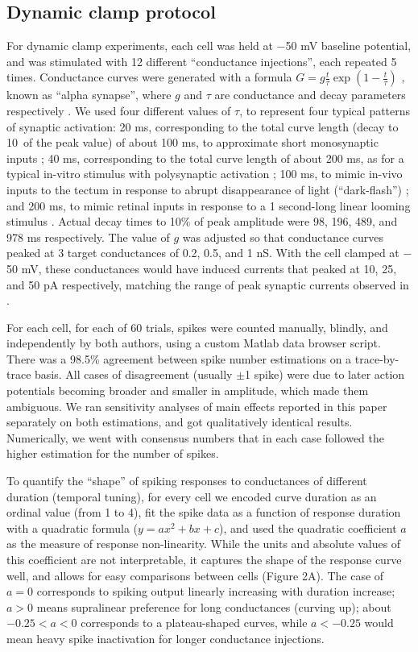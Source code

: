 \documentclass{article}
\begin{document}
\subsection*{Dynamic clamp protocol}

For dynamic clamp experiments, each cell was held at $-$50 mV baseline potential, and was stimulated with 12 different “conductance injections”, each repeated 5 times. Conductance curves were generated with a formula $G=g\frac{t}{\tau}\exp(1-\frac{t}{\tau})$ , known as “alpha synapse”, where $g$ and $\tau$ are conductance and decay parameters respectively \citep{destexhe1994}. We used four different values of $\tau$, to represent four typical patterns of synaptic activation: 20 ms, corresponding to the total curve length (decay to 10\ of the peak value) of about 100 ms, to approximate short monosynaptic inputs \citep{ciarleglio2015}; 40 ms, corresponding to the total curve length of about 200 ms, as for a typical in-vitro stimulus with polysynaptic activation \citep{xu2011}; 100 ms, to mimic in-vivo inputs to the tectum in response to abrupt disappearance of light (“dark-flash”) \citep{khakhalin2014}; and 200 ms, to mimic retinal inputs in response to a 1 second-long linear looming stimulus \citep{khakhalin2014}. Actual decay times to 10\% of peak amplitude were 98, 196, 489, and 978 ms respectively. The value of $g$ was adjusted so that conductance curves peaked at 3 target conductances of 0.2, 0.5, and 1 nS. With the cell clamped at $-$50 mV, these conductances would have induced currents that peaked at 10, 25, and 50 pA respectively, matching the range of peak synaptic currents observed in \citep{xu2011,khakhalin2014,ciarleglio2015}. 

For each cell, for each of 60 trials, spikes were counted manually, blindly, and independently by both authors, using a custom Matlab data browser script. There was a 98.5\% agreement between spike number estimations on a trace-by-trace basis. All cases of disagreement (usually $\pm$1 spike) were due to later action potentials becoming broader and smaller in amplitude, which made them ambiguous. We ran sensitivity analyses of main effects reported in this paper separately on both estimations, and got qualitatively identical results. Numerically, we went with consensus numbers that in each case followed the higher estimation for the number of spikes.

To quantify the “shape” of spiking responses to conductances of different duration (temporal tuning), for every cell we encoded curve duration as an ordinal value (from 1 to 4), fit the spike data as a function of response duration with a quadratic formula ($y = ax^2 + bx +c$), and used the quadratic coefficient $a$ as the measure of response non-linearity. While the units and absolute values of this coefficient are not interpretable, it captures the shape of the response curve well, and allows for easy comparisons between cells (Figure 2A). The case of $a=0$ corresponds to spiking output linearly increasing with duration increase; $a>0$ means supralinear preference for long conductances (curving up); about $-0.25<a<0$ corresponds to a plateau-shaped curves, while $a<-0.25$ would mean heavy spike inactivation for longer conductance injections. 
\end{document}
